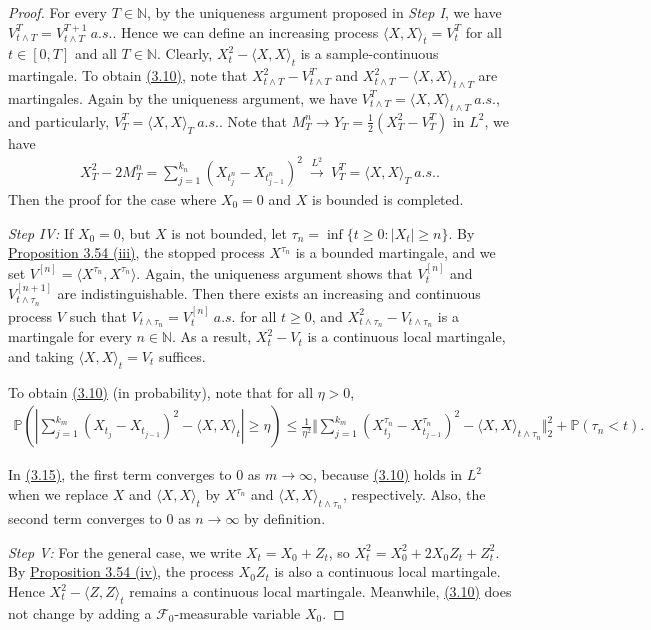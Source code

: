 \documentclass{article}
\numberwithin{equation}{section}
\renewcommand{\P}{\mathbb{P}}
\renewcommand{\proofname}{\textit{Proof}}
\theoremstyle{plain}
\theoremstyle{definition}
\begin{document}
\begin{proof}
For every $T\in\mathbb{N}$, by the uniqueness argument proposed in \textit{Step I}, we have $V_{t\wedge T}^T=V_{t\wedge T}^{T+1}\ a.s.$. Hence we can define an increasing process $\langle X,X\rangle_t=V_t^T$ for all $t\in[0,T]$ and all $T\in\mathbb{N}$. Clearly, $X_t^2-\langle X,X\rangle_t$ is a sample-continuous martingale. To obtain \hyperref[eq:3.10]{(3.10)}, note that $X_{t\wedge T}^2-V_{t\wedge T}^T$ and $X_{t\wedge T}^2-\langle X,X\rangle_{t\wedge T}$ are martingales. Again by the uniqueness argument, we have $V_{t\wedge T}^T=\langle X,X\rangle_{t\wedge T}\ a.s.$, and particularly, $V_T^T=\langle X,X\rangle_T\ a.s.$. Note that $M_T^n\to Y_T = \frac{1}{2}(X_T^2-V_T^T)$ in $L^2$, we have
\begin{align*}
	X_T^2 - 2M_T^n = \sum_{j=1}^{k_n}\left(X_{t_j^n}-X_{t_{j-1}^n}\right)^2\ \overset{L^2}{\to}\ V_T^T = \langle X,X\rangle_T\ a.s..
\end{align*}
Then the proof for the case where $X_0=0$ and $X$ is bounded is completed.\vspace{0.1cm}

\textit{Step IV:} If $X_0=0$, but $X$ is not bounded, let $\tau_n=\inf\{t\geq 0:\vert X_t\vert\geq n\}$. By \hyperref[prop:3.54]{Proposition 3.54 (iii)}, the stopped process $X^{\tau_n}$ is a bounded martingale, and we set $V^{[n]}=\langle X^{\tau_n},X^{\tau_n}\rangle$. Again, the uniqueness argument shows that $V_t^{[n]}$ and $V_{t\wedge\tau_n}^{[n+1]}$ are indistinguishable. Then there exists an increasing and continuous process $V$ such that $V_{t\wedge\tau_n}=V_t^{[n]}\ a.s.$ for all $t\geq 0$, and $X_{t\wedge\tau_n}^2-V_{t\wedge\tau_n}$ is a martingale for every $n\in\mathbb{N}$. As a result, $X_t^2-V_t$ is a continuous local martingale, and taking $\langle X,X\rangle_t = V_t$ suffices. 

To obtain \hyperref[eq:3.10]{(3.10)} (in probability), note that for all $\eta>0$,
\begin{align*}
	\P\left(\left\vert\sum_{j=1}^{k_m}\left(X_{t_j}-X_{t_{j-1}}\right)^2 - \langle X,X\rangle_t\right\vert\geq\eta\right)\leq\frac{1}{\eta^2}\biggl\Vert\sum_{j=1}^{k_m}\left(X_{t_j}^{\tau_n}-X_{t_{j-1}}^{\tau_n}\right)^2 - \langle X,X\rangle_{t\wedge\tau_n}\biggr\Vert_2^2 + \P(\tau_n<t). \tag{3.15}\label{3.15}
\end{align*}

In \hyperref[eq:3.15]{(3.15)}, the first term converges to $0$ as $m\to\infty$, because \hyperref[eq:3.10]{(3.10)} holds in $L^2$ when we replace $X$ and $\langle X,X\rangle_t$ by $X^{\tau_n}$ and $\langle X,X\rangle_{t\wedge\tau_n}$, respectively. Also, the second term converges to $0$ as $n\to\infty$ by definition.
\vspace{0.1cm}

\textit{Step V:}  For the general case, we write $X_t=X_0+Z_t$, so $X_t^2=X_0^2 + 2X_0Z_t + Z_t^2$. By \hyperref[prop:3.54]{Proposition 3.54 (iv)}, the process $X_0Z_t$ is also a continuous local martingale. Hence $X_t^2-\langle Z,Z\rangle_t$ remains a continuous local martingale. Meanwhile, \hyperref[eq:3.10]{(3.10)} does not change by adding a $\mathscr{F}_0$-measurable variable $X_0$.
\end{proof}
\renewcommand{\proofname}{Proof}
\end{document}
